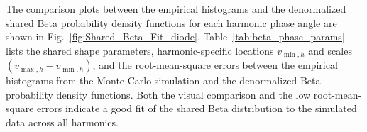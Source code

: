 The comparison plots between the empirical histograms and the denormalized shared Beta probability density functions for each harmonic phase angle are shown in Fig.~\ref{fig:Shared_Beta_Fit_diode}.
Table~\ref{tab:beta_phase_params} lists the shared shape parameters, harmonic-specific locations $v_{\min,h}$ and scales $(v_{\max,h} - v_{\min,h})$, and the root-mean-square errors between the empirical histograms from the Monte Carlo simulation and the denormalized Beta probability density functions. Both the visual comparison and the low root-mean-square errors indicate a good fit of the shared Beta distribution to the simulated data across all harmonics.

